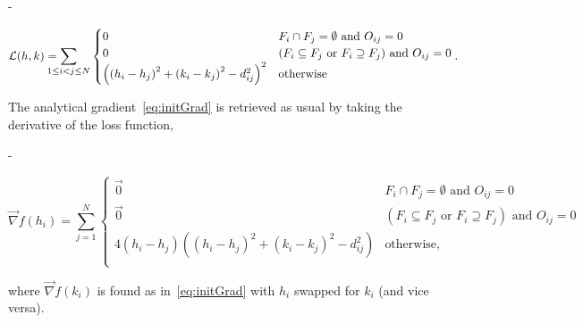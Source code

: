 \documentclass[
  oneside,
  openany,
  numbers=noendperiod,
  parskip=half,
  bibliography=totoc
]{scrbook}\usepackage[]{graphicx}\usepackage{xcolor}
\newlength{\overhang}
\newenvironment{fullwidth}{%
  \blockmargin
  \begin{addmargin*}[0em]{-\overhang}%
}{%
  \end{addmargin*}%
  \unblockmargin
}
\begin{document}
\begin{fullwidth}
\begin{equation}
  \mathcal{L}(h,k) = \displaystyle\smashoperator[l]{\sum_{1\leq i<j\leq N}}
  \begin{cases}
    0 & F_i \cap F_j = \emptyset \text{ and } O_{ij} = 0\\
    0 & (F_i \subseteq F_j \text{ or } F_i \supseteq F_j) \text{ and } O_{ij}=0\\
   \left(\left(h_i-h_j\right)^2+\left(k_i-k_j\right)^2-d_{ij}^2\right)^2  & \text{otherwise} \\
  \end{cases}. \label{eq:initLoss}
\end{equation}
\end{fullwidth}
The analytical gradient~\eqref{eq:initGrad} is retrieved as usual by
taking the derivative of the loss function,
\begin{fullwidth}
\begin{equation}
  \vec{\nabla} f(h_i) = \sum_{j=1}^N
  \begin{cases}
    \vec{0} & F_i \cap F_j = \emptyset \text{ and } O_{ij} = 0\\
    \vec{0} & (F_i \subseteq F_j \text{ or } F_i \supseteq F_j) \text{ and } O_{ij}=0\\
    4\left(h_i-h_j\right)\left(\left(h_i-h_j\right)^2+\left(k_i-k_j\right)^2-d_{ij}^2\right) & \text{otherwise}, \\
  \end{cases} \label{eq:initGrad}
\end{equation}
\end{fullwidth}
where $\vec{\nabla} f(k_i)$ is found as in~\eqref{eq:initGrad} with $h_i$
swapped for $k_i$ (and vice versa).
\end{document}
